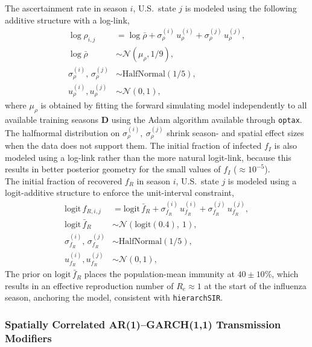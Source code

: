 \documentclass[11pt]{article}
\newcommand{\Normal}{\mathcal{N}}
\newcommand{\HalfNormal}{\text{HalfNormal}}
\begin{document}
The ascertainment rate in season $i$, U.S.\ state $j$ is modeled using the following additive structure with a log-link,
\begin{align}
	 \log \rho_{i,j} &= \log \bar{\rho} + \sigma^{(i)}_\rho\, u^{(i)}_{\rho} + \sigma^{(j)}_\rho\, u^{(j)}_{\rho}, \nonumber\\
    \log \bar{\rho} &\sim \Normal\!\left(\mu_{\rho},1/9\right), \nonumber\\
    \sigma^{(i)}_\rho,\, \sigma^{(j)}_\rho &\sim \HalfNormal\! \left( 1/5 \right), \nonumber\\
    u^{(i)}_{\rho}, u^{(j)}_{\rho} &\sim \Normal(0,1),
\end{align}
where $\mu_\rho$ is obtained by fitting the forward simulating model independently to all available training seasons $\bm{D}$ using the Adam algorithm available through \texttt{optax}. The halfnormal distribution on $\sigma_{\rho}^{(i)},~\sigma_{\rho}^{(j)}$ shrink season- and spatial effect sizes when the data does not support them. The initial fraction of infected $f_I$ is also modeled using a log-link rather than the more natural logit-link, because this results in better posterior geometry for the small values of $f_I$ ($\approx 10^{-5}$).\\

The initial fraction of recovered $f_R$ in season $i$, U.S.\ state $j$ is modeled using a logit-additive structure to enforce the unit-interval constraint,
\begin{align}\label{eq:f_R}
	\text{logit}\,f_{R,i,j} &= \text{logit}\,\bar{f}_R + \sigma^{(i)}_{f_R}\, u^{(i)}_{f_R} + \sigma^{(j)}_{f_R}\, u^{(j)}_{f_R}, \nonumber\\
    \text{logit}\,\bar{f}_R &\sim \Normal\!\left(\text{logit}(0.4),\ 1\right), \nonumber\\
    \sigma^{(i)}_{f_R},\, \sigma^{(j)}_{f_R} &\sim \HalfNormal\!\left(1/5\right), \nonumber\\
    u^{(i)}_{f_R}, u^{(j)}_{f_R} &\sim \Normal(0,1),
\end{align}
The prior on $\text{logit}\,\bar{f}_R$ places the population-mean immunity at $40\pm10\%$, which results in an effective reproduction number of $R_e \approx 1$ at the start of the influenza season, anchoring the model, consistent with \texttt{hierarchSIR}.

\subsubsection*{Spatially Correlated AR(1)--GARCH(1,1) Transmission Modifiers}\label{sec:argarch}
\end{document}
